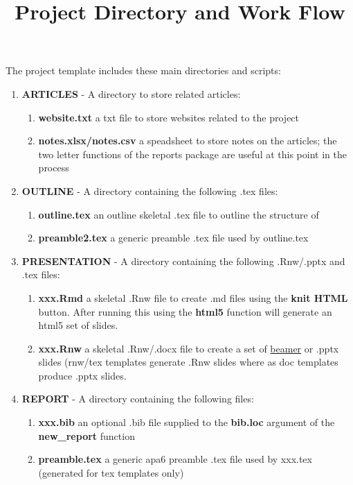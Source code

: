 \documentclass{article}\usepackage{graphicx, color}
\begin{document}
\title{Project Directory and Work Flow}
\author{}
\date{}
\maketitle

The project template includes these main directories and scripts:

\begin{enumerate}
  \item \textbf{ARTICLES} - A directory to store related articles:
  \begin{enumerate}
    \item \textbf{website.txt} a txt file to store websites related to the project
    \item \textbf{notes.xlsx/notes.csv} a speadsheet to store notes on the articles; the two letter functions of the reports package are useful at this point in the process
  \end{enumerate}
  \item \textbf{OUTLINE} - A directory containing the following .tex files:
  \begin{enumerate}
    \item \textbf{outline.tex} an outline skeletal .tex file to outline the structure of  
    \item \textbf{preamble2.tex} a generic preamble .tex file used by outline.tex  
  \end{enumerate}  
  \item \textbf{PRESENTATION} - A directory containing the following .Rnw/.pptx and .tex files:
  \begin{enumerate}
    \item \textbf{xxx.Rmd} a skeletal .Rnw file to create .md files using the \textbf{knit HTML} button.  After running this using the \textbf{html5} function will generate an html5 set of slides.
    \item \textbf{xxx.Rnw} a skeletal .Rnw/.docx file to create a set of \href{http://www.math.umbc.edu/~rouben/beamer/}{beamer} or .pptx slides (rnw/tex templates generate .Rnw slides where as doc templates produce .pptx slides.   
  \end{enumerate} 
  \item \textbf{REPORT} - A directory containing the following files:
  \begin{enumerate}
    \item \textbf{xxx.bib} an optional .bib file supplied to the \textbf{bib.loc} argument of the \textbf{new\_report} function
    \item \textbf{preamble.tex} a generic apa6 preamble .tex file used by xxx.tex (generated for tex templates only) 

\end{enumerate}
\end{enumerate}
\end{document}
